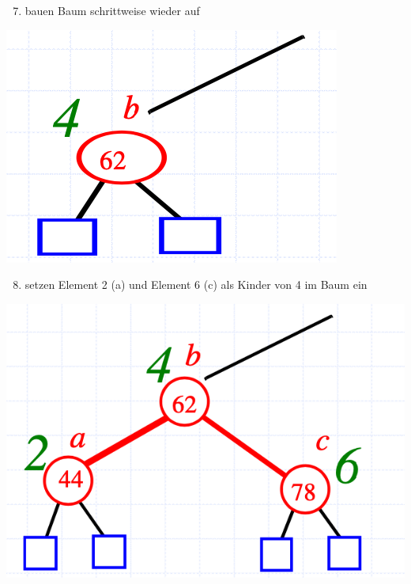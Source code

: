 \begin{enumerate}
    \setcounter{enumi}{6}
    \item bauen Baum schrittweise wieder auf
\end{enumerate}
\vspace{-8pt}
\begin{center}
    \includegraphics[scale=.25]{graphic/02 AVLTrees/Cut-Link5.png}
\end{center}
\vspace{-8pt}

\begin{enumerate}
    \setcounter{enumi}{7}
    \item setzen Element 2 (a) und Element 6 (c) als Kinder von 4 im Baum ein
\end{enumerate}
\vspace{-8pt}
\begin{center}
    \includegraphics[scale=.2]{graphic/02 AVLTrees/Cut-Link6.png}
\end{center}
\vspace{-8pt}

